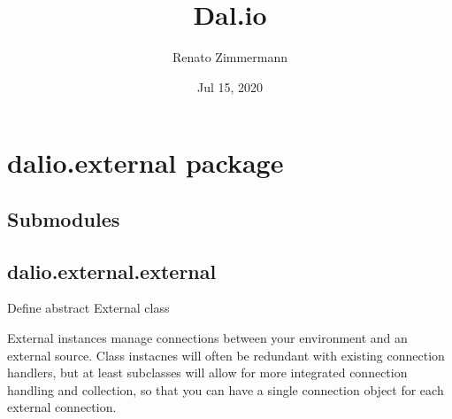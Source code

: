 \documentclass[letterpaper,10pt,english]{sphinxmanual}
\title{Dal.io}
\date{Jul 15, 2020}
\author{Renato Zimmermann}
\begin{document}
\pagestyle{empty}
\sphinxmaketitle
\pagestyle{plain}
\sphinxtableofcontents
\pagestyle{normal}
\label{\detokenize{index::doc}}



\chapter{dalio.external package}
\label{\detokenize{dalio.external:dalio-external-package}}\label{\detokenize{dalio.external::doc}}

\section{Submodules}
\label{\detokenize{dalio.external:submodules}}

\section{dalio.external.external}
\label{\detokenize{dalio.external:module-dalio.external.external}}\label{\detokenize{dalio.external:dalio-external-external}}
Define abstract External class

External instances manage connections between your environment and an
external source. Class instacnes will often be redundant with existing
connection handlers, but at least subclasses will allow for more integrated
connection handling and collection, so that you can have a single connection
object for each external connection.
\end{document}
